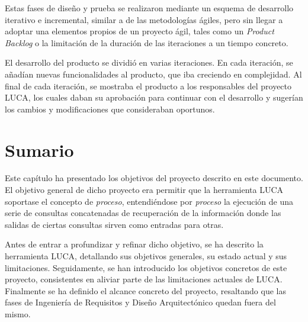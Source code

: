 Estas fases de diseño y prueba se realizaron mediante un esquema de desarrollo iterativo e incremental, similar a de las metodologías ágiles, pero sin llegar a adoptar una elementos propios de un proyecto ágil, tales como un \emph{Product Backlog} o la limitación de la duración de las iteraciones a un tiempo concreto.

El desarrollo del producto se dividió en varias iteraciones. En cada iteración, se añadían nuevas funcionalidades al producto, que iba creciendo en complejidad. Al final de cada iteración, se mostraba el producto a los responsables del proyecto LUCA, los cuales daban su aprobación para continuar con el desarrollo y sugerían los cambios y modificaciones que consideraban oportunos. 


\section{Sumario}

Este capítulo ha presentado los objetivos del proyecto descrito en este documento. El objetivo general de dicho proyecto era permitir que la herramienta LUCA soportase el concepto de \emph{proceso}, entendiéndose por \emph{proceso} la ejecución de una serie de consultas concatenadas de recuperación de la información donde las salidas de ciertas consultas sirven como entradas para otras. 

Antes de entrar a profundizar y refinar dicho objetivo, se ha descrito la herramienta LUCA, detallando sus objetivos generales, su estado actual y sus limitaciones. Seguidamente, se han introducido los objetivos concretos de este proyecto, consistentes en aliviar parte de las limitaciones actuales de LUCA. Finalmente se ha definido el alcance concreto del proyecto, resaltando que las fases de Ingeniería de Requisitos y Diseño Arquitectónico quedan fuera del mismo.